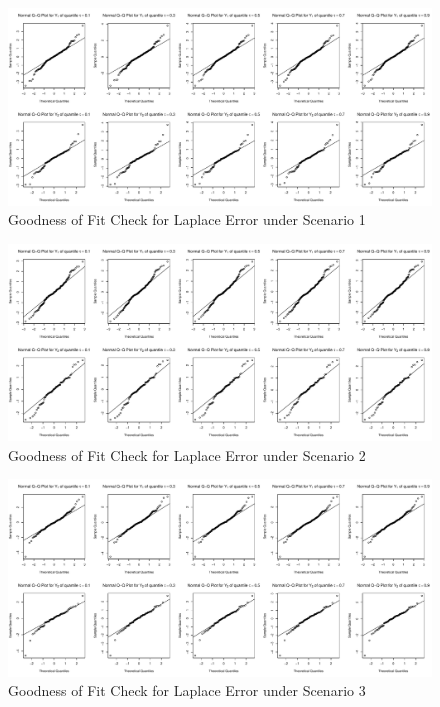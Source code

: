 \documentclass{article}
\begin{document}
\begin{figure}[h]
\centerline{\includegraphics[scale=.4]{../image/LPS1}}
\caption{Goodness of Fit Check for Laplace Error under Scenario 1}
\end{figure}

\begin{figure}[h]
\centerline{\includegraphics[scale=.4]{../image/LPS2}}
\caption{Goodness of Fit Check for Laplace Error under Scenario 2}
\end{figure}

\begin{figure}[h]
\centerline{\includegraphics[scale=.4]{../image/LPS3}}
\caption{Goodness of Fit Check for Laplace Error under Scenario 3}
\end{figure}
\end{document}
